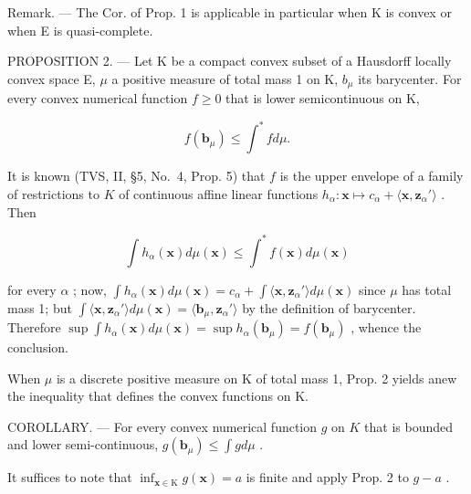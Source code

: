 Remark. --- The Cor. of Prop. 1 is applicable in particular when K is convex or when E is quasi-complete.

PROPOSITION 2. --- Let K be a compact convex subset of a Hausdorff locally convex space E, \(\mu\) a positive measure of total mass 1 on K, \(b_{\mu}\) its barycenter. For every convex numerical function \(f \geqslant 0\) that is lower semicontinuous on K,

\[
f (\mathbf {b} _ {\mu}) \leqslant \int^ {*} f d \mu .
\]

It is known (TVS, II, §5, No.~4, Prop. 5) that \(f\) is the upper envelope of a family of restrictions to \(K\) of continuous affine linear functions \(h_{\alpha} : \mathbf{x} \mapsto c_{\alpha} + \langle \mathbf{x}, \mathbf{z}_{\alpha}' \rangle\) . Then

\[
\int h _ {\alpha} (\mathbf {x}) d \mu (\mathbf {x}) \leqslant \int^ {*} f (\mathbf {x}) d \mu (\mathbf {x})
\]

for every \(\alpha\) ; now, \(\int h_{\alpha}(\mathbf{x}) d\mu (\mathbf{x}) = c_{\alpha} + \int \langle \mathbf{x}, \mathbf{z}_{\alpha}' \rangle d\mu (\mathbf{x})\) since \(\mu\) has total mass 1; but \(\int \langle \mathbf{x}, \mathbf{z}_{\alpha}' \rangle d\mu (\mathbf{x}) = \langle \mathbf{b}_{\mu}, \mathbf{z}_{\alpha}' \rangle\) by the definition of barycenter. Therefore \(\sup \int h_{\alpha}(\mathbf{x}) d\mu (\mathbf{x}) = \sup h_{\alpha}(\mathbf{b}_{\mu}) = f(\mathbf{b}_{\mu})\) , whence the conclusion.

When \(\mu\) is a discrete positive measure on K of total mass 1, Prop. 2 yields anew the inequality that defines the convex functions on K.

COROLLARY. --- For every convex numerical function \(g\) on \(K\) that is bounded and lower semi-continuous, \(g(\mathbf{b}_{\mu}) \leqslant \int g d\mu\) .

It suffices to note that \(\inf_{\mathbf{x} \in \mathrm{K}} g(\mathbf{x}) = a\) is finite and apply Prop. 2 to \(g - a\) .

